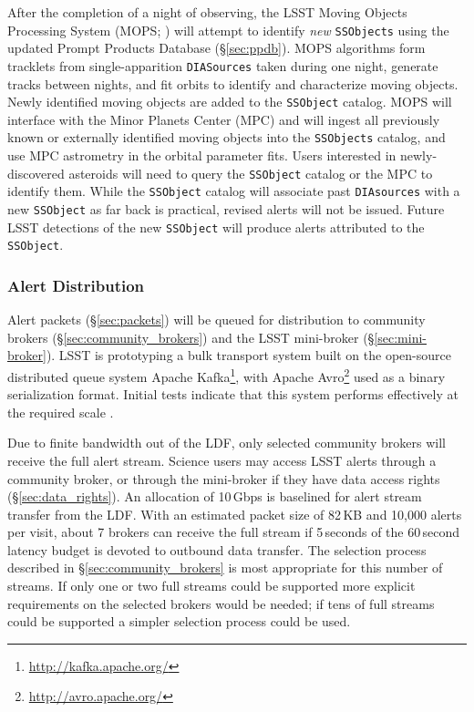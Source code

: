 After the completion of a night of observing,
the LSST Moving Objects Processing System (MOPS; ) will attempt to identify \textit{new} \texttt{SSObjects} using the updated Prompt Products Database (\S \ref{sec:ppdb}).
MOPS algorithms form tracklets from single-apparition \texttt{DIASources} taken during one night, generate tracks between nights, and fit orbits to identify and characterize moving objects.
Newly identified moving objects are added to the {\tt SSObject} catalog.
MOPS will interface with the Minor Planets Center (MPC) and will ingest all previously known or externally identified moving objects into the {\tt SSObjects} catalog, and use MPC astrometry in the orbital parameter fits.
Users interested in newly-discovered asteroids will need to query the \texttt{SSObject} catalog or the MPC to identify them.
While the \texttt{SSObject} catalog will associate past \texttt{DIAsources} with a new \texttt{SSObject} as far back is practical, revised alerts will not be issued.
Future LSST detections of the new \texttt{SSObject} will produce alerts attributed to the \texttt{SSObject}.


\subsubsection{Alert Distribution} \label{sec:alert_distribution}

Alert packets (\S \ref{sec:packets}) will be queued for distribution to community brokers (\S \ref{sec:community_brokers}) and the LSST mini-broker (\S \ref{sec:mini-broker}). 
LSST is prototyping  a bulk transport system built on the open-source distributed queue system Apache Kafka\footnote{\url{http://kafka.apache.org/}}, with Apache Avro\footnote{\url{http://avro.apache.org/}} used as a binary serialization format.
Initial tests indicate that this system performs effectively at the required scale .

Due to finite bandwidth out of the LDF, only selected community brokers will receive the full alert stream.
Science users may access LSST alerts through a community broker, or through the mini-broker if they have data access rights (\S \ref{sec:data_rights}).
An allocation of 10\,Gbps is baselined for alert stream transfer from the LDF.
With an estimated packet size of 82\,KB and 10,000 alerts per visit, about 7 brokers can receive the full stream if 5\,seconds of the 60\,second latency budget is devoted to outbound data transfer.
The selection process described in \S \ref{sec:community_brokers} is most appropriate for this number of streams.
If only one or two full streams could be supported more explicit requirements on the selected brokers would be needed; if tens of full streams could be supported a simpler selection process could be used. 

